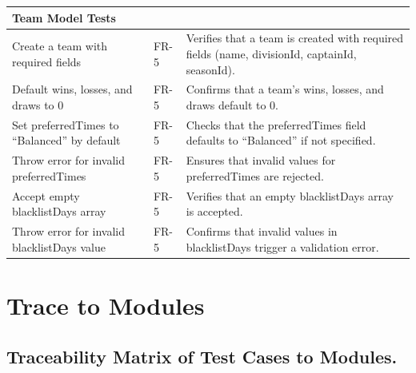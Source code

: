 \documentclass[12pt, titlepage]{article}
\begin{document}
\begin{longtable}{|p{}|p{}|p{}|}
    \textbf{Team Model Tests} & & \\ \hline
    Create a team with required fields & FR-5 & Verifies that a team is created with required fields (name, divisionId, captainId, seasonId). \\ \hline
    Default wins, losses, and draws to 0 & FR-5 & Confirms that a team's wins, losses, and draws default to 0. \\ \hline
    Set preferredTimes to ``Balanced'' by default & FR-5 & Checks that the preferredTimes field defaults to ``Balanced'' if not specified. \\ \hline
    Throw error for invalid preferredTimes & FR-5 & Ensures that invalid values for preferredTimes are rejected. \\ \hline
    Accept empty blacklistDays array & FR-5 & Verifies that an empty blacklistDays array is accepted. \\ \hline
    Throw error for invalid blacklistDays value & FR-5 & Confirms that invalid values in blacklistDays trigger a validation error. \\ \hline
    
\end{longtable}
    
		
\section{Trace to Modules}

\subsection*{Traceability Matrix of Test Cases to Modules.}
\end{document}
